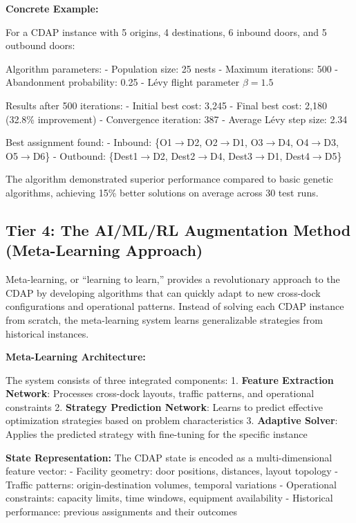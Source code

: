 \documentclass{article}
\begin{document}
\textbf{Concrete Example:}

For a CDAP instance with 5 origins, 4 destinations, 6 inbound doors, and 5 outbound doors:

Algorithm parameters:
- Population size: 25 nests
- Maximum iterations: 500
- Abandonment probability: 0.25
- Lévy flight parameter $\beta = 1.5$

Results after 500 iterations:
- Initial best cost: 3,245
- Final best cost: 2,180 (32.8\% improvement)
- Convergence iteration: 387
- Average Lévy step size: 2.34

Best assignment found:
- Inbound: \{O1$\rightarrow$D2, O2$\rightarrow$D1, O3$\rightarrow$D4, O4$\rightarrow$D3, O5$\rightarrow$D6\}
- Outbound: \{Dest1$\rightarrow$D2, Dest2$\rightarrow$D4, Dest3$\rightarrow$D1, Dest4$\rightarrow$D5\}

The algorithm demonstrated superior performance compared to basic genetic algorithms, achieving 15\% better solutions on average across 30 test runs.

\subsection{Tier 4: The AI/ML/RL Augmentation Method (Meta-Learning Approach)}

Meta-learning, or ``learning to learn,'' provides a revolutionary approach to the CDAP by developing algorithms that can quickly adapt to new cross-dock configurations and operational patterns. Instead of solving each CDAP instance from scratch, the meta-learning system learns generalizable strategies from historical instances.

\textbf{Meta-Learning Architecture:}

The system consists of three integrated components:
1. \textbf{Feature Extraction Network}: Processes cross-dock layouts, traffic patterns, and operational constraints
2. \textbf{Strategy Prediction Network}: Learns to predict effective optimization strategies based on problem characteristics
3. \textbf{Adaptive Solver}: Applies the predicted strategy with fine-tuning for the specific instance

\textbf{State Representation:}
The CDAP state is encoded as a multi-dimensional feature vector:
- Facility geometry: door positions, distances, layout topology
- Traffic patterns: origin-destination volumes, temporal variations
- Operational constraints: capacity limits, time windows, equipment availability
- Historical performance: previous assignments and their outcomes
\end{document}
